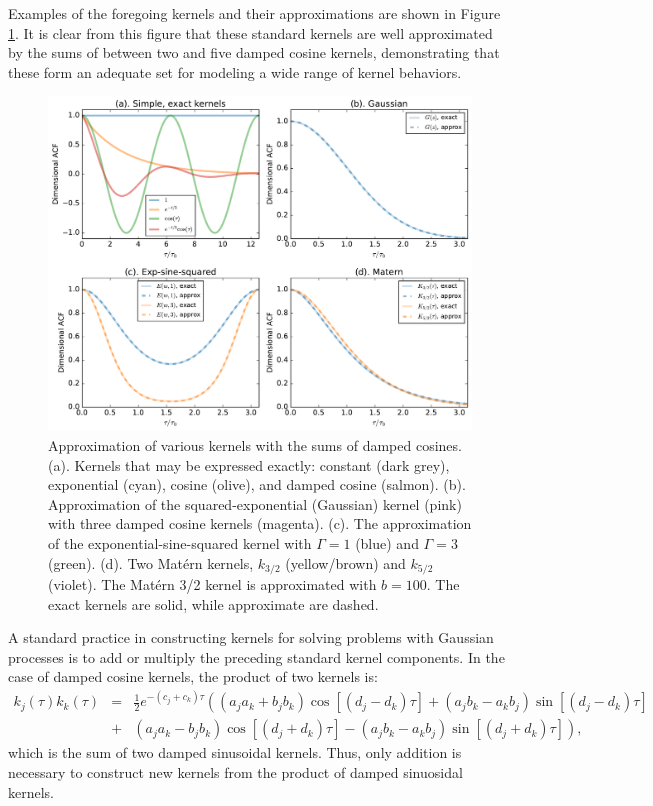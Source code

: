 \documentclass[manuscript, letterpaper]{aastex6}
\begin{document}
Examples of the foregoing kernels and their approximations are shown in Figure \ref{kernel_approx}.
It is clear from this figure that these standard kernels are well approximated by the sums
of between two and five damped cosine kernels, demonstrating that these form an adequate set
for modeling a wide range of kernel behaviors.

\begin{figure}[!htbp]
\begin{center}
\includegraphics[width=\textwidth]{./approximate_kernels/kernel_approx.pdf}
\caption{Approximation of various kernels with the sums of damped cosines.
(a). Kernels that may be expressed exactly: constant (dark grey), exponential (cyan),
cosine (olive), and damped cosine (salmon).
(b). Approximation of the squared-exponential (Gaussian) kernel (pink) with three
damped cosine kernels (magenta). (c). The approximation of the exponential-sine-squared
kernel with $\Gamma =1$ (blue) and $\Gamma = 3$ (green). (d). Two Mat\'ern kernels,
$k_{3/2}$ (yellow/brown) and $k_{5/2}$ (violet).  The Mat\'ern 3/2 kernel
is approximated with $b=100$. The exact kernels are solid, while approximate are dashed.}
\label{kernel_approx}
\end{center}
\end{figure}

A standard practice in constructing kernels for solving problems with Gaussian processes
is to add or multiply the preceding standard kernel components.  In the case of damped cosine
kernels, the product of two kernels is:
\begin{eqnarray}
k_j(\tau)k_k(\tau) &=&
\frac{1}{2} e^{-(c_j+c_k) \tau} \left((a_ja_k+b_jb_k)\cos{\left[(d_j-d_k)\tau\right]} + (a_jb_k-a_kb_j)\sin{\left[(d_j-d_k)\tau\right]} \right. \\
 &+&\left.(a_ja_k-b_jb_k)\cos{\left[(d_j+d_k)\tau\right]} -(a_jb_k-a_kb_j)\sin{\left[(d_j+d_k)\tau\right]}\right),
\end{eqnarray}
which is the sum of two damped sinusoidal kernels.  Thus, only addition is necessary to
construct new kernels from the product of damped sinuosidal kernels.
\end{document}
